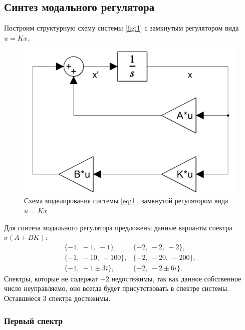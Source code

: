 \subsection{Синтез модального регулятора}

Построим структурную схему системы \autoref{fig:1} 
с замкнутым регулятором вида $u=Kx$.
\begin{figure}[H]
    \centering
    \includegraphics[width=0.7\linewidth]{figs/task1_slx.png}
    \caption{Схема моделирования системы \ref{eq:1}, замкнутой
    регулятором вида $u=Kx$}
    \label{fig:1}
\end{figure}
\noindent Для синтеза модального регулятора предложены 
данные варианты спектра $\sigma(A+BK)$:
\begin{equation*}
    \begin{array}{rl}
        \{-1,\ -1,\ -1\}, & \{-2,\ -2,\ -2\}, \\
        \{-1,\ -10,\ -100\}, & \{-2,\ -20,\ -200\}, \\
        \{-1,\ -1\pm 3i\}, & \{-2,\ -2\pm 6i\}.
    \end{array}
\end{equation*}
Спектры, которые не содержат $-2$ недостежимы, так как
данное собственное число неуправляемо, оно всегда будет
присутствовать в спектре системы. Оставшиеся
3 спектра достежимы.

\subsubsection{Первый спектр}

